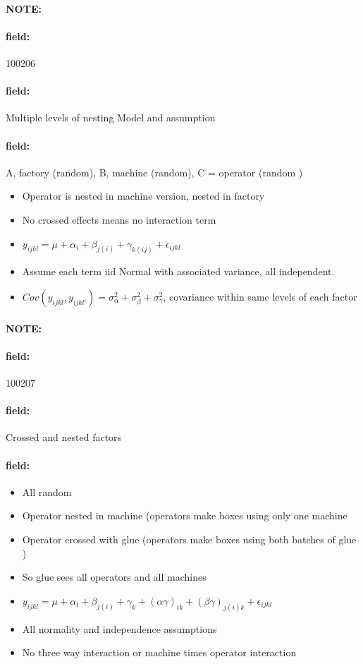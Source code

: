 \documentclass[12pt]{article}
\newenvironment{note}{\paragraph{NOTE:}}{}
\newenvironment{field}{\paragraph{field:}}{}
\begin{document}
\begin{note}
    \begin{field}
        \tiny 100206
    \end{field}
    \begin{field}
        Multiple levels of nesting Model and assumption
    \end{field}
    \begin{field}
        A, factory (random), B, machine (random), C = operator (random )
        \begin{itemize}
          \item Operator is nested in machine version, nested in factory
          \item No crossed effects means no interaction term
          \item $y_{ijkl} = \mu +\alpha_i + \beta_{j(i)} + \gamma_{k(ij)} + \epsilon_{ijkl}$
          \item Assume each term iid Normal with associated variance, all independent.
          \item $Cov(y_{ijkl}, y_{ijkl'}) = \sigma_\alpha^2 + \sigma_\beta^2 + \sigma_\gamma^2$, covariance within same levels of each factor
        \end{itemize}
    \end{field}
\end{note}

\begin{note}
    \begin{field}
        \tiny 100207
    \end{field}
    \begin{field}
        Crossed and nested factors
    \end{field}
    \begin{field}
        \begin{itemize}
          \item All random
          \item Operator nested in machine (operators make boxes using only one machine
          \item Operator crossed with glue (operators make boxes using both batches of glue )
          \item So glue sees all operators and all machines
          \item $y_{ijkl} = \mu + \alpha_i + \beta_{j(i)} + \gamma_k + (\alpha\gamma)_{ik} + (\beta\gamma)_{j(i)k} + \epsilon_{ijkl}$
          \item All normality and independence assumptions
          \item No three way interaction or machine times operator interaction
        \end{itemize}
    \end{field}
\end{note}
\end{document}

